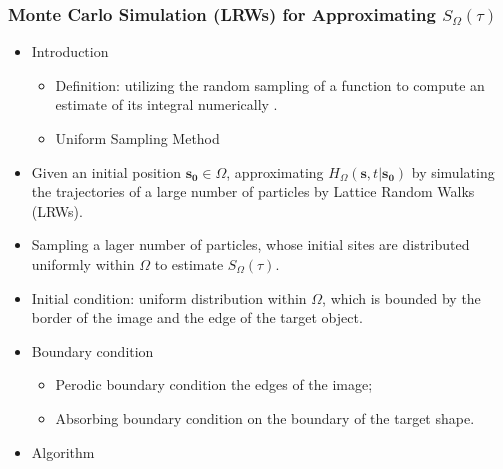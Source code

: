       
         
    \subsubsection{Monte Carlo Simulation (LRWs) for Approximating $S_{\Omega}(\tau)$}
          

        \begin{itemize}
          \item Introduction
            \begin{itemize}
              \item Definition: utilizing the random sampling of a function to compute an estimate of its integral numerically \cite{hammersley1960monte}.
              \item Uniform Sampling Method
            \end{itemize}
            
          \item Given an initial position $\bm{s_0} \in \Omega$, approximating $H_{\Omega}(\bm{s}, t | \bm{s_0})$ by simulating the trajectories of a large number of particles by Lattice Random Walks (LRWs).
          \item Sampling a lager number of particles, whose initial sites are distributed uniformly within $\Omega$ to estimate $S_{\Omega}(\tau)$.
        \end{itemize}
        
          
        \begin{itemize}    
          \item Initial condition: uniform distribution within $\Omega$, which is bounded by the border of the image and the edge of the target object.
          \item Boundary condition
            \begin{itemize}
              \item Perodic boundary condition the edges of the image;
              \item Absorbing boundary condition on the boundary of the target shape.
           \end{itemize}
          \item Algorithm
        \end{itemize}
        
             
